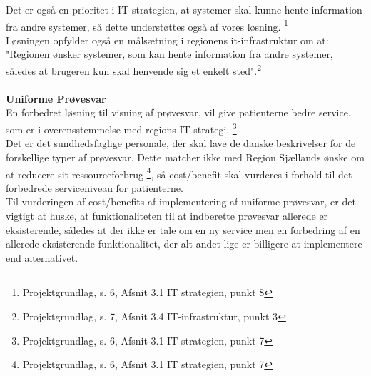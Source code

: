 Det er også en prioritet i IT-strategien, at systemer skal kunne hente information fra andre systemer, så dette understøttes også af vores løsning. \footnote{Projektgrundlag, s. 6, Afsnit 3.1 IT strategien, punkt 8} \\
Løsningen opfylder også en målsætning i regionens it-infrastruktur om at: "Regionen ønsker systemer, som kan hente information fra andre systemer, således at brugeren kun skal henvende sig et enkelt sted".\footnote{Projektgrundlag, s. 7, Afsnit 3.4 IT-infrastruktur, punkt 3}
\\\\
\textbf{Uniforme Prøvesvar}\\ %
En forbedret løsning til visning af prøvesvar, vil give patienterne bedre service, som er i overensstemmelse med regions IT-strategi. \footnote{Projektgrundlag, s. 6, Afsnit 3.1 IT strategien, punkt 7}\\
Det er det sundhedsfaglige personale, der skal lave de danske beskrivelser for de forskellige typer af prøvesvar. Dette matcher ikke med Region Sjællands ønske om at reducere sit ressourceforbrug \footnote{Projektgrundlag, s. 6, Afsnit 3.1 IT strategien, punkt 7}, så cost/benefit skal vurderes i forhold til det forbedrede serviceniveau for patienterne.\\
Til vurderingen af cost/benefits af implementering af uniforme prøvesvar, er det vigtigt at huske, at funktionaliteten til at indberette prøvesvar allerede er eksisterende, således at der ikke er tale om en ny service men en forbedring af en allerede eksisterende funktionalitet, der alt andet lige er billigere at implementere end alternativet.

